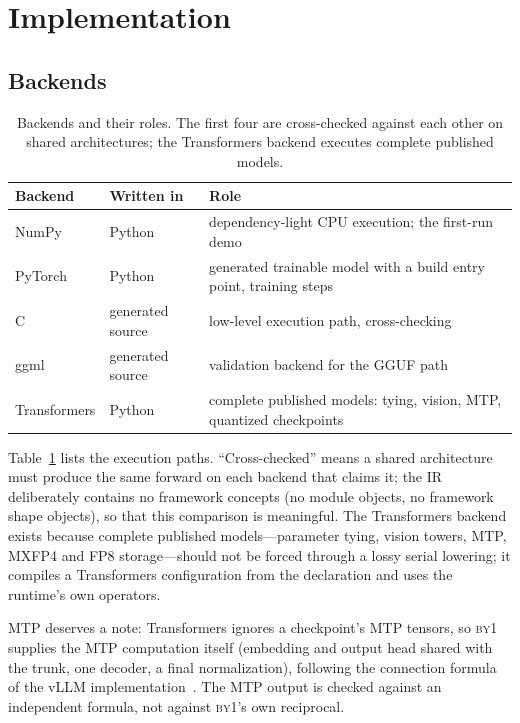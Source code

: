 \documentclass[11pt,a4paper]{article}
\newcommand{\byone}{\textsc{by1}}
\newcommand{\q}[1]{\textquotedblleft #1\textquotedblright}
\begin{document}
\section{Implementation}
\label{sec:impl}

\subsection{Backends}

\begin{table}[t]
\centering
\caption{Backends and their roles. The first four are cross-checked against
each other on shared architectures; the Transformers backend executes
complete published models.}
\label{tab:backends}
\begin{tabular}{@{}p{3.2cm}p{3.2cm}p{6.2cm}@{}}
\toprule
Backend & Written in & Role \\
\midrule
NumPy & Python & dependency-light CPU execution; the first-run demo \\
PyTorch & Python & generated trainable model with a build entry point,
training steps \\
C & generated source & low-level execution path, cross-checking \\
ggml & generated source & validation backend for the GGUF path \\
Transformers & Python & complete published models: tying, vision, MTP,
quantized checkpoints \\
\bottomrule
\end{tabular}
\end{table}

Table~\ref{tab:backends} lists the execution paths. \q{Cross-checked} means a
shared architecture must produce the same forward on each backend that claims
it; the IR deliberately contains no framework concepts (no module objects, no
framework shape objects), so that this comparison is meaningful. The
Transformers backend exists because complete published models---parameter
tying, vision towers, MTP, MXFP4 and FP8 storage---should not be forced
through a lossy serial lowering; it compiles a Transformers configuration from
the declaration and uses the runtime's own operators.

MTP deserves a note: Transformers ignores a checkpoint's MTP tensors, so
\byone{} supplies the MTP computation itself (embedding and output head shared
with the trunk, one decoder, a final normalization), following the connection
formula of the vLLM implementation~\cite{kwon2023vllm}. The MTP output is
checked against an independent formula, not against \byone{}'s own reciprocal.
\end{document}
